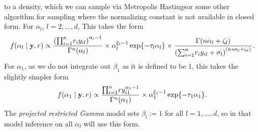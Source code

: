   to a density, which we can sample via Metropolis Hastings\findcite or some other algorithm for
  sampling where the normalizing constant is not available in closed form.  For $\alpha_l$,
  $l = 2,\ldots, d$, This takes the form
  \begin{equation}
    \label{eqn:alphafc}
    f(\alpha_l \mid {\bf y}, r) \propto
    \frac{\left({\small \prod}_{i = 1}^nr_iy_{il}\right)^{\alpha_l - 1}}{\Gamma^n(\alpha_l)} \times
    \alpha_l^{\xi_l - 1}\exp\{-\tau_l\alpha_l\} \times
    \frac{\Gamma(n\alpha_l + \zeta_l)}{
        \left({\small\sum}_{i = 1}^n r_iy_{il} + \sigma_l\right)^{(n * \alpha_l + \zeta_l)}}.
  \end{equation}
  For $\alpha_1$, as we do not integrate out $\beta_1$ as it is defined to be $1$, this takes the
  slightly simpler form
  \begin{equation}
    \label{eqn:alphafc1}
    f(\alpha_1 \mid {\bf y}, r) \propto
      \frac{{\small\prod}_{i = 1}^n ry_{i1}^{\alpha_1 - 1}}{\Gamma^n(\alpha_1)} \times
      \alpha_1^{\xi_1 - 1}\exp\{-\tau_1\alpha_1\}.
  \end{equation}
  The \emph{projected restricted Gamma} model sets $\beta_l := 1$ for all $l = 1,\ldots,d$, so in that
  model inference on all $\alpha_l$ will use this form.

